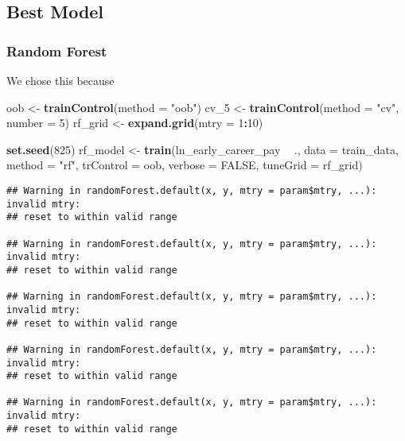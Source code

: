 \documentclass[
]{article}
\newenvironment{Shaded}{\begin{snugshade}}{\end{snugshade}}
\newcommand{\DataTypeTok}[1]{\textcolor[rgb]{0.13,0.29,0.53}{#1}}
\newcommand{\DecValTok}[1]{\textcolor[rgb]{0.00,0.00,0.81}{#1}}
\newcommand{\KeywordTok}[1]{\textcolor[rgb]{0.13,0.29,0.53}{\textbf{#1}}}
\newcommand{\NormalTok}[1]{#1}
\newcommand{\OperatorTok}[1]{\textcolor[rgb]{0.81,0.36,0.00}{\textbf{#1}}}
\newcommand{\OtherTok}[1]{\textcolor[rgb]{0.56,0.35,0.01}{#1}}
\newcommand{\StringTok}[1]{\textcolor[rgb]{0.31,0.60,0.02}{#1}}
\begin{document}
\hypertarget{best-model}{%
\subsection{Best Model}\label{best-model}}

\hypertarget{random-forest}{%
\subsubsection{Random Forest}\label{random-forest}}

We chose this because

\begin{Shaded}
\begin{Highlighting}[]
\NormalTok{oob <-}\StringTok{ }\KeywordTok{trainControl}\NormalTok{(}\DataTypeTok{method =} \StringTok{"oob"}\NormalTok{)}
\NormalTok{cv_}\DecValTok{5}\NormalTok{ <-}\StringTok{ }\KeywordTok{trainControl}\NormalTok{(}\DataTypeTok{method =} \StringTok{"cv"}\NormalTok{, }\DataTypeTok{number =} \DecValTok{5}\NormalTok{)}
\NormalTok{rf_grid <-}\StringTok{ }\KeywordTok{expand.grid}\NormalTok{(}\DataTypeTok{mtry =} \DecValTok{1}\OperatorTok{:}\DecValTok{10}\NormalTok{)}

\KeywordTok{set.seed}\NormalTok{(}\DecValTok{825}\NormalTok{)}
\NormalTok{rf_model <-}\StringTok{ }\KeywordTok{train}\NormalTok{(ln_early_career_pay }\OperatorTok{~}\StringTok{ }\NormalTok{., }\DataTypeTok{data =}\NormalTok{ train_data,}
                     \DataTypeTok{method =} \StringTok{"rf"}\NormalTok{,}
                     \DataTypeTok{trControl =}\NormalTok{ oob,}
                     \DataTypeTok{verbose =} \OtherTok{FALSE}\NormalTok{,}
                     \DataTypeTok{tuneGrid =}\NormalTok{ rf_grid)}
\end{Highlighting}
\end{Shaded}

\begin{verbatim}
## Warning in randomForest.default(x, y, mtry = param$mtry, ...): invalid mtry:
## reset to within valid range

## Warning in randomForest.default(x, y, mtry = param$mtry, ...): invalid mtry:
## reset to within valid range

## Warning in randomForest.default(x, y, mtry = param$mtry, ...): invalid mtry:
## reset to within valid range

## Warning in randomForest.default(x, y, mtry = param$mtry, ...): invalid mtry:
## reset to within valid range

## Warning in randomForest.default(x, y, mtry = param$mtry, ...): invalid mtry:
## reset to within valid range
\end{verbatim}
\end{document}
